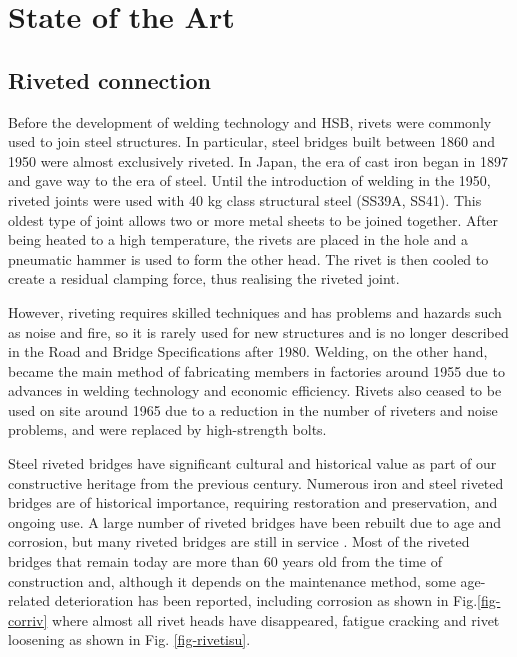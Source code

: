 \chapter{State of the Art}
\label{ch2}

\begin{spacing}{1.25} %
\minitoc %
\end{spacing} %
\onehalfspacing %

\section{Riveted connection}

Before the development of welding technology and \ac{HSB}, rivets were commonly used to join steel structures. In particular, steel bridges built between 1860 and 1950 were almost exclusively riveted. In Japan, the era of cast iron began in 1897 and gave way to the era of steel. Until the introduction of welding in the 1950, riveted joints were used with 40 kg class structural steel (SS39A, SS41)\cite{rivet1934}. This oldest type of joint allows two or more metal sheets to be joined together. After being heated to a high temperature, the rivets are placed in the hole and a pneumatic hammer is used to form the other head. The rivet is then cooled to create a residual clamping force, thus realising the riveted joint.

However, riveting requires skilled techniques and has problems and hazards such as noise and fire, so it is rarely used for new structures and is no longer described in the Road and Bridge Specifications after 1980. Welding, on the other hand, became the main method of fabricating members in factories around 1955 due to advances in welding technology and economic efficiency. Rivets also ceased to be used on site around 1965 due to a reduction in the number of riveters and noise problems, and were replaced by high-strength bolts.

Steel riveted bridges have significant cultural and historical value as part of our constructive heritage from the previous century. Numerous iron and steel riveted bridges are of historical importance, requiring restoration and preservation, and ongoing use. A large number of riveted bridges have been rebuilt due to age and corrosion, but many riveted bridges are still in service \cite{COLLETTE2014}. Most of the riveted bridges that remain today are more than 60 years old from the time of construction and, although it depends on the maintenance method, some age-related deterioration has been reported, including corrosion as shown in Fig.\ref{fig-corriv} where almost all rivet heads have disappeared, fatigue cracking and rivet loosening as shown in Fig. \ref{fig-rivetisu}.

